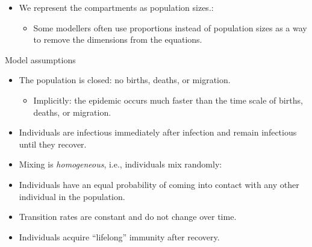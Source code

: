 \documentclass[
  ignorenonframetext,
]{beamer}
\providecommand{\tightlist}{%
  \setlength{\itemsep}{0pt}\setlength{\parskip}{0pt}}\usepackage{longtable,booktabs,array}
\begin{document}
\begin{frame}
\begin{tcolorbox}[enhanced jigsaw, colframe=quarto-callout-note-color-frame, toprule=.15mm, opacitybacktitle=0.6, breakable, colback=white, leftrule=.75mm, left=2mm, opacityback=0, titlerule=0mm, bottomtitle=1mm, toptitle=1mm, title={Note}, bottomrule=.15mm, arc=.35mm, coltitle=black, colbacktitle=quarto-callout-note-color!10!white, rightrule=.15mm]

\begin{itemize}
\tightlist
\item
  We represent the compartments as {population sizes}.:

  \begin{itemize}
  \tightlist
  \item
    Some modellers often use {proportions} instead of population sizes
    as a way to remove the dimensions from the equations.
  \end{itemize}
\end{itemize}

\end{tcolorbox}
\end{frame}

\begin{frame}
\begin{block}{Model assumptions}
\label{model-assumptions}
\begin{itemize}
\tightlist
\item
  The population is closed: no births, deaths, or migration.

  \begin{itemize}
  \tightlist
  \item
    Implicitly: the epidemic occurs much faster than the time scale of
    births, deaths, or migration.
  \end{itemize}
\item
  Individuals are infectious immediately after infection and remain
  infectious until they recover.
\end{itemize}
\end{block}
\end{frame}

\begin{frame}
\begin{itemize}
\item
  Mixing is \emph{homogeneous}, i.e., {individuals mix randomly}:
\item
  Individuals have an equal probability of coming into contact with any
  other individual in the population.
\item
  Transition rates are constant and do not change over time.
\item
  Individuals acquire ``lifelong'' immunity after recovery.
\end{itemize}

\end{frame}
\end{document}
